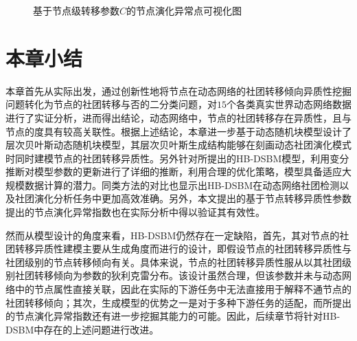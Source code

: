 \begin{figure}
	\centering
	\caption{基于节点级转移参数$C$的节点演化异常点可视化图}
	\label{fig:anomalyPics}
\end{figure}


\section{本章小结}
本章首先从实际出发，通过创新性地将节点在动态网络的社团转移倾向异质性挖掘问题转化为节点的社团转移与否的二分类问题，对$15$个各类真实世界动态网络数据进行了实证分析，进而得出结论，动态网络中，节点的社团转移存在异质性，且与节点的度具有较高关联性。根据上述结论，本章进一步基于动态随机块模型设计了层次贝叶斯动态随机块模型，其层次贝叶斯生成结构能够在刻画动态社团演化模式时同时建模节点的社团转移异质性。另外针对所提出的HB-DSBM模型，利用变分推断对模型参数的更新进行了详细的推断，利用合理的优化策略，模型具备适应大规模数据计算的潜力。同类方法的对比也显示出HB-DSBM在动态网络社团检测以及社团演化分析任务中更加高效准确。另外，本文提出的基于节点转移异质性参数提出的节点演化异常指数也在实际分析中得以验证其有效性。

然而从模型设计的角度来看，HB-DSBM仍然存在一定缺陷，首先，其对节点的社团转移异质性建模主要从生成角度而进行的设计，即假设节点的社团转移异质性与社团级别的节点转移倾向有关。具体来说，节点的社团转移异质性服从以其社团级别社团转移倾向为参数的狄利克雷分布。该设计虽然合理，但该参数并未与动态网络中的节点属性直接关联，因此在实际的下游任务中无法直接用于解释不通节点的社团转移倾向；其次，生成模型的优势之一是对于多种下游任务的适配，而所提出的节点演化异常指数还有进一步挖掘其能力的可能。因此，后续章节将针对HB-DSBM中存在的上述问题进行改进。











